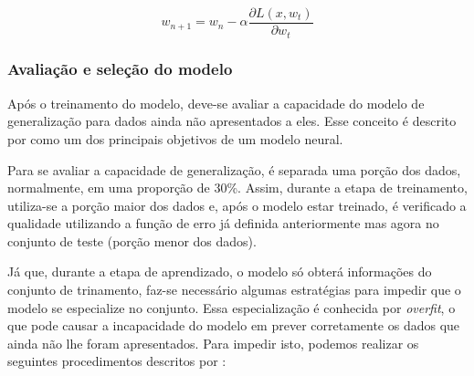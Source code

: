 \documentclass[
    12pt,
    oneside,
    a4paper,
    english,
    brazil
]{abntex2}
\begin{document}
\begin{equation}\label{eq:backpropagation}
    w_{n+1} = w_n - \alpha \frac{\partial L(x,w_t)}{\partial w_t}
\end{equation}

\subsubsection{Avaliação e seleção do modelo}

Após  o treinamento  do  modelo, deve-se  avaliar a  capacidade  do modelo  de
generalização  para  dados  ainda  não  apresentados a  eles.  Esse  conceito
é descrito  por   como um  dos principais
objetivos de um modelo neural.

Para se avaliar a capacidade de generalização, é separada uma porção
dos  dados, normalmente,  em uma  proporção de  30\%. Assim,  durante a  etapa de
treinamento, utiliza-se a porção  maior dos dados  e, após o  modelo estar
treinado,  é verificado  a qualidade  utilizando a  função de  erro já  definida
anteriormente mas agora no conjunto de teste (porção menor dos dados).

Já  que, durante  a  etapa  de  aprendizado, o  modelo  só  obterá  informações
do  conjunto  de   trinamento,  faz-se  necessário   algumas  estratégias  para
impedir  que  o  modelo  se  especialize no  conjunto.  Essa  especialização  é
conhecida por \textit{overfit}, o que pode  causar a incapacidade do  modelo em
prever  corretamente  os  dados  que  ainda não  lhe foram  apresentados.  Para
impedir  isto, podemos  realizar   os  seguintes  procedimentos  descritos  por
:
\end{document}
